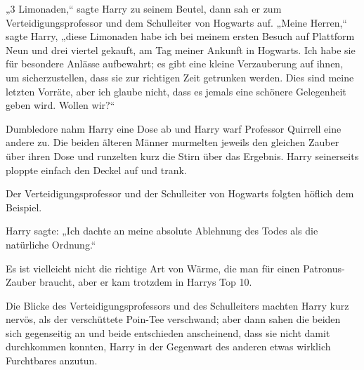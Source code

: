 „3 Limonaden,“ sagte Harry zu seinem Beutel, dann sah er zum Verteidigungsprofessor und dem Schulleiter von Hogwarts auf. „Meine Herren,“ sagte Harry, „diese Limonaden habe ich bei meinem ersten Besuch auf Plattform Neun und drei viertel gekauft, am Tag meiner Ankunft in Hogwarts. Ich habe sie für besondere Anlässe aufbewahrt; es gibt eine kleine Verzauberung auf ihnen, um sicherzustellen, dass sie zur richtigen Zeit getrunken werden. Dies sind meine letzten Vorräte, aber ich glaube nicht, dass es jemals eine schönere Gelegenheit geben wird. Wollen wir?“

Dumbledore nahm Harry eine Dose ab und Harry warf Professor Quirrell eine andere zu. Die beiden älteren Männer murmelten jeweils den gleichen Zauber über ihren Dose und runzelten kurz die Stirn über das Ergebnis. Harry seinerseits ploppte einfach den Deckel auf und trank.

Der Verteidigungsprofessor und der Schulleiter von Hogwarts folgten höflich dem Beispiel.

Harry sagte: „Ich dachte an meine absolute Ablehnung des Todes als die natürliche Ordnung.“

Es ist vielleicht nicht die richtige Art von Wärme, die man für einen Patronus-Zauber braucht, aber er kam trotzdem in Harrys Top 10.

Die Blicke des Verteidigungsprofessors und des Schulleiters machten Harry kurz nervös, als der verschüttete Poin-Tee verschwand; aber dann sahen die beiden sich gegenseitig an und beide entschieden anscheinend, dass sie nicht damit durchkommen konnten, Harry in der Gegenwart des anderen etwas wirklich Furchtbares anzutun.

